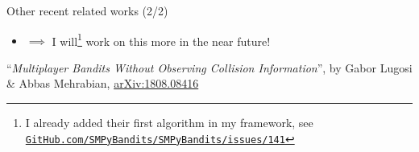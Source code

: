 \begin{frame}{Other recent related works (2/2)}
\begin{itemize}
\pause
\item
$\implies$ I will\footnote{\tiny I already added their first algorithm in my framework, see \href{https://github.com/SMPyBandits/SMPyBandits/issues/141}{\texttt{GitHub.com/SMPyBandits/SMPyBandits/issues/141}}}
work on this more in the near future!

\end{itemize}

\vfill{}
\begin{footnotesize}
  ``\emph{Multiplayer Bandits Without Observing Collision Information}'',
  by Gabor Lugosi \& Abbas Mehrabian,
  \textcolor{blue}{\href{https://arxiv.org/abs/1808.08416}{arXiv:1808.08416}}
\end{footnotesize}

\end{frame}